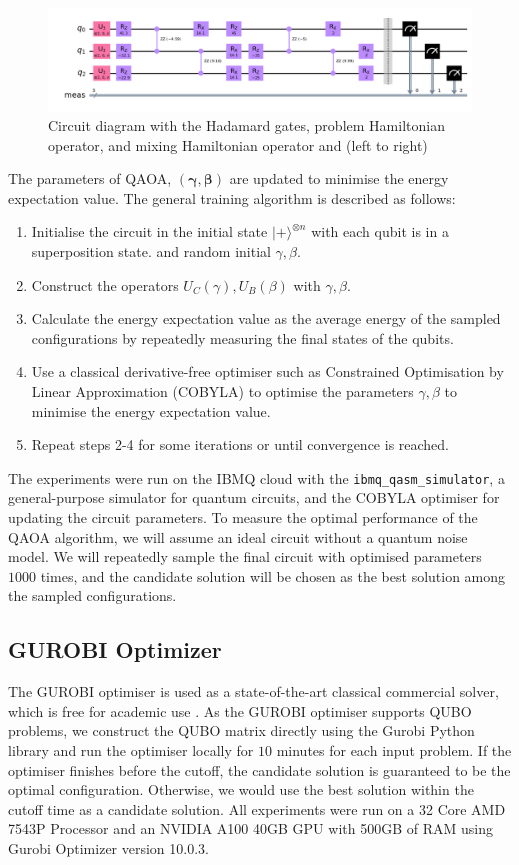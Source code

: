 \begin{figure}[h!]
    \centering
    \includegraphics[width=1\linewidth]{images/qiskit_circuit.png}
    \caption{Circuit diagram with the Hadamard gates, problem Hamiltonian operator, and mixing Hamiltonian operator and  (left to right)}
    \label{qiskitcircuit}
\end{figure}

The parameters of QAOA, $(\boldsymbol{\gamma}, \boldsymbol{\beta})$ are updated to minimise the energy expectation value. The general training algorithm is described as follows:
\begin{enumerate}
    \item Initialise the circuit in the initial state $| + \rangle^{\otimes n}$ with each qubit is in a superposition state. and random initial $\gamma, \beta$. 
    \item Construct the operators $U_C(\gamma), U_B(\beta)$ with $\gamma, \beta$.
    \item Calculate the energy expectation value as the average energy of the sampled configurations by repeatedly measuring the final states of the qubits.
    \item Use a classical derivative-free optimiser such as Constrained Optimisation by Linear Approximation (COBYLA) to optimise the parameters $\gamma, \beta$ to minimise the energy expectation value.
    \item Repeat steps 2-4 for some iterations or until convergence is reached.
\end{enumerate}
The experiments were run on the IBMQ cloud with the \texttt{ibmq\_qasm\_simulator}, a general-purpose simulator for quantum circuits, and the COBYLA optimiser for updating the circuit parameters. To measure the optimal performance of the QAOA algorithm, we will assume an ideal circuit without a quantum noise model. We will repeatedly sample the final circuit with optimised parameters $1000$ times, and the candidate solution will be chosen as the best solution among the sampled configurations.


\subsection{GUROBI Optimizer}
The GUROBI optimiser is used as a state-of-the-art classical commercial solver, which is free for academic use \cite{b26}. As the GUROBI optimiser supports QUBO problems, we construct the QUBO matrix directly using the Gurobi Python library and run the optimiser locally for $10$ minutes for each input problem. If the optimiser finishes before the cutoff, the candidate solution is guaranteed to be the optimal configuration. Otherwise, we would use the best solution within the cutoff time as a candidate solution. All experiments were run on a 32 Core AMD 7543P Processor and an NVIDIA A100 40GB GPU with 500GB of RAM using Gurobi Optimizer version 10.0.3.

